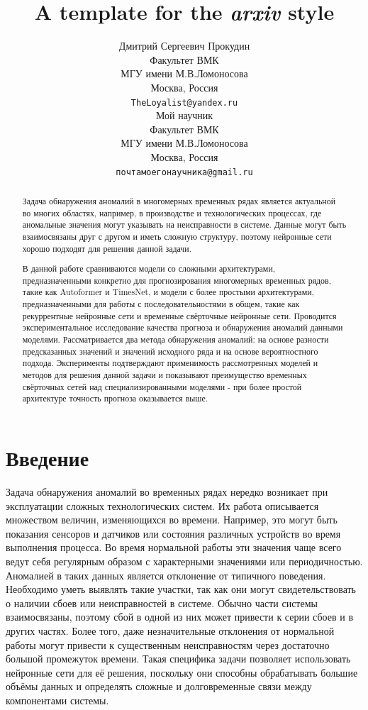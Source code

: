 \documentclass{article}
\title{A template for the \emph{arxiv} style}
\author{  Дмитрий Сергеевич Прокудин \\
	Факультет ВМК \\
    МГУ имени М.В.Ломоносова \\
	Москва, Россия \\
	\texttt{TheLoyalist@yandex.ru} \\
	\And
	Мой научник \\
	Факультет ВМК \\
    МГУ имени М.В.Ломоносова \\
	Москва, Россия \\
	\texttt{почтамоегонаучника@gmail.ru}  \\
}
\date{}
\begin{document}
\maketitle

\begin{abstract}
Задача обнаружения аномалий в многомерных временных рядах является актуальной во многих областях, например, в производстве и технологических процессах, где аномальные значения могут указывать на неисправности в системе. Данные могут быть взаимосвязаны друг с другом и иметь сложную структуру, поэтому нейронные сети хорошо подходят для решения данной задачи.  
    
В данной работе сравниваются модели со сложными архитектурами, предназначенными конкретно для прогнозирования многомерных временных рядов, такие как Autoformer и TimesNet, и модели с более простыми архитектурами, предназначенными для работы с последовательностями в общем, такие как рекуррентные нейронные сети и временные свёрточные нейронные сети. Проводится экспериментальное исследование качества прогноза и обнаружения аномалий данными моделями. Рассматривается два метода обнаружения аномалий: на основе разности предсказанных значений и значений исходного ряда и на основе вероятностного подхода. Эксперименты подтверждают применимость рассмотренных моделей и методов для решения данной задачи и показывают преимущество временных свёрточных сетей над специализированными моделями - при более простой архитектуре точность прогноза оказывается выше. 
\end{abstract}



\section{Введение}
Задача обнаружения аномалий во временных рядах нередко возникает при эксплуатации сложных технологических систем. Их работа описывается множеством величин, изменяющихся во времени. Например, это могут быть показания сенсоров и датчиков или состояния различных устройств во время выполнения процесса. Во время нормальной работы эти значения чаще всего ведут себя регулярным образом с характерными значениями или периодичностью. Аномалией в таких данных является отклонение от типичного поведения. Необходимо уметь выявлять такие участки, так как они могут свидетельствовать о наличии сбоев или неисправностей в системе. Обычно части системы взаимосвязаны, поэтому сбой в одной из них может привести к серии сбоев и в других частях. Более того, даже незначительные отклонения от нормальной работы могут привести к существенным неисправностям через достаточно большой промежуток времени. Такая специфика задачи позволяет использовать нейронные сети для её решения, поскольку они способны обрабатывать большие объёмы данных и определять сложные и долговременные связи между компонентами системы. 
\end{document}
